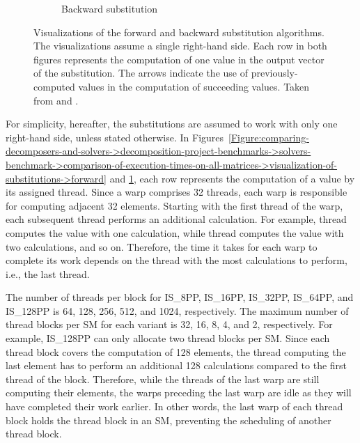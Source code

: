 \begin{figure}[ht!]
\begin{subfigure}[b]{0.48\textwidth}
		\caption{Backward substitution}
		\label{Figure:comparing-decomposers-and-solvers->decomposition-project-benchmarks->solvers-benchmark->comparison-of-execution-times-on-all-matrices->visualization-of-substitutions->backward}
	\end{subfigure}
	\caption{Visualizations of the forward and backward substitution algorithms.
		The visualizations assume a single right-hand side.
		Each row in both figures represents the computation of one value in the output vector of the substitution.
		The arrows indicate the use of previously-computed values in the computation of succeeding values.
		Taken from  \cite{Frolov18July2022} and  \cite{Frolov17July2022}.
	}
	\label{Figure:comparing-decomposers-and-solvers->decomposition-project-benchmarks->solvers-benchmark->comparison-of-execution-times-on-all-matrices->visualization-of-substitutions}
\end{figure}

For simplicity, hereafter, the substitutions are assumed to work with only one right-hand side, unless stated otherwise.
In Figures~\ref{Figure:comparing-decomposers-and-solvers->decomposition-project-benchmarks->solvers-benchmark->comparison-of-execution-times-on-all-matrices->visualization-of-substitutions->forward} and \ref{Figure:comparing-decomposers-and-solvers->decomposition-project-benchmarks->solvers-benchmark->comparison-of-execution-times-on-all-matrices->visualization-of-substitutions->backward}, each row represents the computation of a value by its assigned thread.
Since a warp comprises 32 threads, each warp is responsible for computing adjacent 32 elements.
Starting with the first thread of the warp, each subsequent thread performs an additional calculation.
For example, thread  computes the value with one calculation, while thread  computes the value with two calculations, and so on.
Therefore, the time it takes for each warp to complete its work depends on the thread with the most calculations to perform, i.e., the last thread.

The number of threads per block for IS\_8PP, IS\_16PP, IS\_32PP, IS\_64PP, and IS\_128PP is 64, 128, 256, 512, and 1024, respectively.
The maximum number of thread blocks per SM for each variant is 32, 16, 8, 4, and 2, respectively.
For example, IS\_128PP can only allocate two thread blocks per SM.
Since each thread block covers the computation of 128 elements, the thread computing the last element has to perform an additional 128 calculations compared to the first thread of the block.
Therefore, while the threads of the last warp are still computing their elements, the warps preceding the last warp are idle as they will have completed their work earlier.
In other words, the last warp of each thread block holds the thread block in an SM, preventing the scheduling of another thread block.

